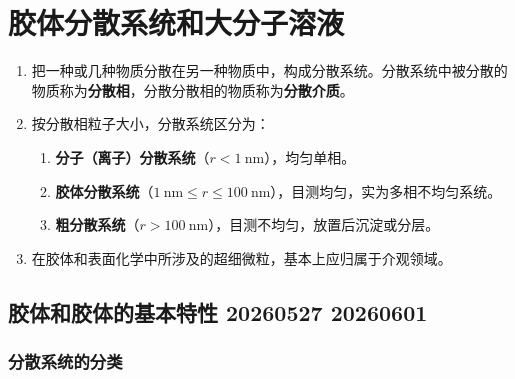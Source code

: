 \section{胶体分散系统和大分子溶液}

\begin{enumerate}
    \item 把一种或几种物质分散在另一种物质中，构成分散系统。分散系统中被分散的物质称为\textbf{分散相}，分散分散相的物质称为\textbf{分散介质}。
    \item 按分散相粒子大小，分散系统区分为：
    \begin{enumerate}
        \item \textbf{分子（离子）分散系统}（$r < \qty{1}{\nano\meter}$），均匀单相。
        \item \textbf{胶体分散系统}（$\qty{1}{\nano\meter} \leq r \leq \qty{100}{\nano\meter}$），目测均匀，实为多相不均匀系统。
        \item \textbf{粗分散系统}（$r > \qty{100}{\nano\meter}$），目测不均匀，放置后沉淀或分层。
    \end{enumerate}
    \item 在胶体和表面化学中所涉及的超细微粒，基本上应归属于介观领域。
\end{enumerate}

\subsection{胶体和胶体的基本特性 20260527 20260601}

\subsubsection{分散系统的分类}

